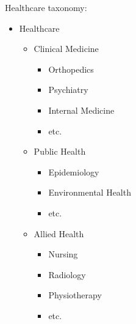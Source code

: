 Healthcare taxonomy:

\begin{itemize}
    \item Healthcare
    \begin{itemize}
        \item Clinical Medicine
        \begin{itemize}
            \item Orthopedics
            \item Psychiatry
            \item Internal Medicine
            \item etc.
        \end{itemize}
        \item Public Health
        \begin{itemize}
            \item Epidemiology
            \item Environmental Health
            \item etc.
        \end{itemize}
        \item Allied Health
        \begin{itemize}
            \item Nursing
            \item Radiology
            \item Physiotherapy
            \item etc.
        \end{itemize}
    \end{itemize}
\end{itemize}

